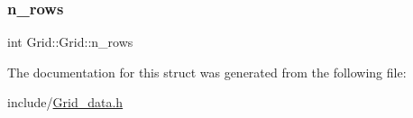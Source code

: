 \subsubsection{\texorpdfstring{n\+\_\+rows}{n\_rows}}
{\footnotesize\ttfamily int Grid\+::\+Grid\+::n\+\_\+rows}



The documentation for this struct was generated from the following file\+:\begin{DoxyCompactItemize}
\item 
include/\mbox{\hyperlink{_grid__data_8h}{Grid\+\_\+data.\+h}}\end{DoxyCompactItemize}
